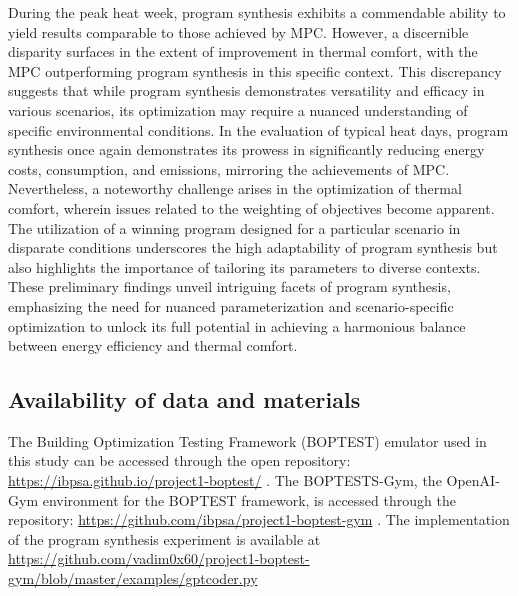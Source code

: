 During the peak heat week, program synthesis exhibits a commendable ability to yield results comparable to those achieved by MPC. However, a discernible disparity surfaces in the extent of improvement in thermal comfort, with the MPC outperforming program synthesis in this specific context. This discrepancy suggests that while program synthesis demonstrates versatility and efficacy in various scenarios, its optimization may require a nuanced understanding of specific environmental conditions. In the evaluation of typical heat days, program synthesis once again demonstrates its prowess in significantly reducing energy costs, consumption, and emissions, mirroring the achievements of MPC. Nevertheless, a noteworthy challenge arises in the optimization of thermal comfort, wherein issues related to the weighting of objectives become apparent. The utilization of a winning program designed for a particular scenario in disparate conditions underscores the high adaptability of program synthesis but also highlights the importance of tailoring its parameters to diverse contexts. These preliminary findings unveil intriguing facets of program synthesis, emphasizing the need for nuanced parameterization and scenario-specific optimization to unlock its full potential in achieving a harmonious balance between energy efficiency and thermal comfort.


\subsection*{Availability of data and materials}
The Building Optimization Testing Framework (BOPTEST) emulator used in this study can be accessed through the open repository: \href{https://ibpsa.github.io/project1-boptest/}{https://ibpsa.github.io/project1-boptest/} .
The BOPTESTS-Gym, the OpenAI-Gym environment for the BOPTEST framework, is accessed through the repository: \href{https://github.com/ibpsa/project1-boptest-gym}{https://github.com/ibpsa/project1-boptest-gym} .
The implementation of the program synthesis experiment is available at \url{https://github.com/vadim0x60/project1-boptest-gym/blob/master/examples/gptcoder.py} 